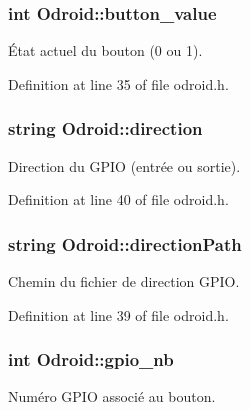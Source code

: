 \hypertarget{classOdroid_a9d14734cc57d1a962b7b214f84376727}{
\subsubsection[{button\-\_\-value}]{\setlength{\rightskip}{0pt plus 5cm}int Odroid\-::button\-\_\-value\hspace{0.3cm}{\ttfamily [private]}}}\label{classOdroid_a9d14734cc57d1a962b7b214f84376727}
État actuel du bouton (0 ou 1). 

Definition at line 35 of file odroid.\-h.

\hypertarget{classOdroid_acb053e5e5f9060d7884abf6dd6c29358}{
\subsubsection[{direction}]{\setlength{\rightskip}{0pt plus 5cm}string Odroid\-::direction\hspace{0.3cm}{\ttfamily [private]}}}\label{classOdroid_acb053e5e5f9060d7884abf6dd6c29358}
Direction du G\-P\-I\-O (entrée ou sortie). 

Definition at line 40 of file odroid.\-h.

\hypertarget{classOdroid_aa74658114a7f7d6d31dba4b7e7955674}{
\subsubsection[{direction\-Path}]{\setlength{\rightskip}{0pt plus 5cm}string Odroid\-::direction\-Path\hspace{0.3cm}{\ttfamily [private]}}}\label{classOdroid_aa74658114a7f7d6d31dba4b7e7955674}
Chemin du fichier de direction G\-P\-I\-O. 

Definition at line 39 of file odroid.\-h.

\hypertarget{classOdroid_a936074d84ad18c34e19ee1f1ea59fcbf}{
\subsubsection[{gpio\-\_\-nb}]{\setlength{\rightskip}{0pt plus 5cm}int Odroid\-::gpio\-\_\-nb\hspace{0.3cm}{\ttfamily [private]}}}\label{classOdroid_a936074d84ad18c34e19ee1f1ea59fcbf}
Numéro G\-P\-I\-O associé au bouton. 

